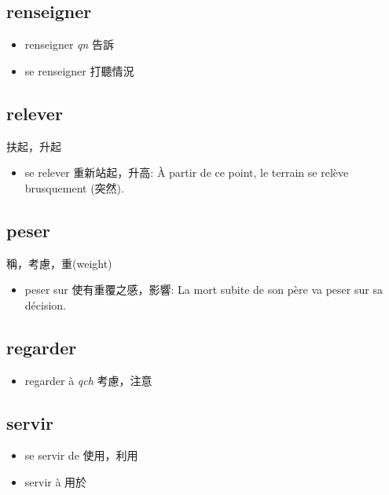 \documentclass{book}
\begin{document}
        \subsection{renseigner}
            \begin{itemize}
                \item renseigner \textit{qn} 告訴
                \item se renseigner 打聽情況
            \end{itemize}   
        
        \subsection{relever}
            扶起，升起
            \begin{itemize}
                \item se relever 重新站起，升高: À partir de ce point, le terrain se relève brusquement (突然).
            \end{itemize}
        
        \subsection{peser}
            稱，考慮，重(weight)
            \begin{itemize}
                \item peser sur 使有重覆之感，影響: La mort subite de son père va peser sur sa décision.
            \end{itemize}
        
        \subsection{regarder}
            \begin{itemize}
                \item regarder à \textit{qch} 考慮，注意
            \end{itemize}

        \subsection{servir}
            \begin{itemize}
                \item se servir de 使用，利用
                \item servir à 用於
            \end{itemize}
\end{document}
